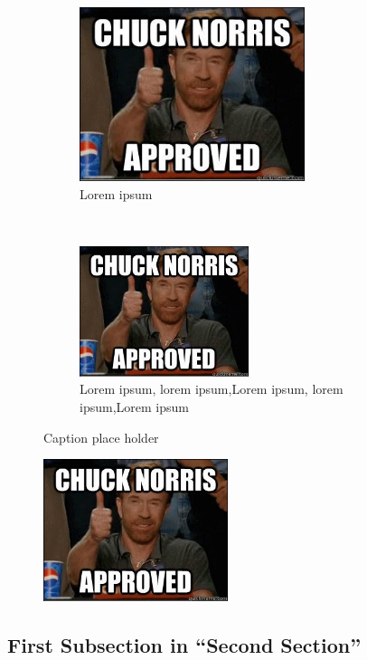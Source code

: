 \begin{figure}[t!]
    \centering
    \begin{subfigure}[t]{0.5\textwidth}
        \centering
        \includegraphics[height=2.0in]{Images/Approved.jpg}
        \caption{Lorem ipsum}
    \end{subfigure}%
    ~ 
    \begin{subfigure}[t]{0.5\textwidth}
        \centering
        \includegraphics[height=1.5in]{Images/Approved.jpg}
        \caption{Lorem ipsum, lorem ipsum,Lorem ipsum, lorem ipsum,Lorem ipsum}
    \end{subfigure}
    \caption{Caption place holder}
\end{figure}


\begin{figure}
  \begin{center}
    \includegraphics[width=0.48\textwidth]{Images/Approved.jpg}
  \end{center}
\end{figure}
\subsection{First Subsection in ``Second Section''}

